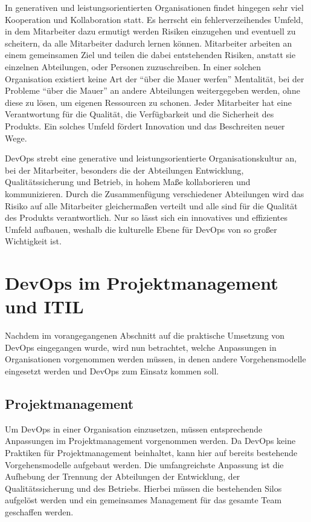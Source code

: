 In generativen und leistungsorientierten Organisationen findet hingegen sehr viel Kooperation und Kollaboration statt. 
Es herrscht ein fehlerverzeihendes Umfeld, in dem Mitarbeiter dazu ermutigt werden Risiken einzugehen und eventuell zu scheitern, da alle Mitarbeiter dadurch lernen können. 
Mitarbeiter arbeiten an einem gemeinsamen Ziel und teilen die dabei entstehenden Risiken, anstatt sie einzelnen Abteilungen, oder Personen zuzuschreiben. In einer solchen Organisation existiert keine Art der \enquote{über die Mauer werfen} Mentalität, bei der Probleme \enquote{über die Mauer} an andere Abteilungen weitergegeben werden, ohne diese zu lösen, um eigenen Ressourcen zu schonen. 
Jeder Mitarbeiter hat eine Verantwortung für die Qualität, die Verfügbarkeit und die Sicherheit des Produkts. 
Ein solches Umfeld fördert Innovation und das Beschreiten neuer Wege. \parencite[Vgl.][S. 2]{westrum:2004}

DevOps strebt eine generative und leistungsorientierte Organisationskultur an, bei der Mitarbeiter, besonders die der Abteilungen Entwicklung, Qualitätssicherung und Betrieb, in hohem Maße kollaborieren und kommunizieren. 
Durch die Zusammenfügung verschiedener Abteilungen wird das Risiko auf alle Mitarbeiter gleichermaßen verteilt und alle sind für die Qualität des Produkts verantwortlich.
Nur so lässt sich ein innovatives und effizientes Umfeld aufbauen, weshalb die kulturelle Ebene für DevOps von so großer Wichtigkeit ist.

\section{DevOps im Projektmanagement und ITIL} %
Nachdem im vorangegangenen Abschnitt auf die praktische Umsetzung von DevOps eingegangen wurde, wird nun betrachtet, welche Anpassungen in Organisationen vorgenommen werden müssen, in denen andere Vorgehensmodelle eingesetzt werden und DevOps zum Einsatz kommen soll.

\subsection{Projektmanagement}
Um DevOps in einer Organisation einzusetzen, müssen entsprechende Anpassungen im Projektmanagement vorgenommen werden. 
Da DevOps keine Praktiken für Projektmanagement beinhaltet, kann hier auf bereits bestehende Vorgehensmodelle aufgebaut werden.
Die umfangreichste Anpassung ist die Aufhebung der Trennung der Abteilungen der Entwicklung, der Qualitätssicherung und des Betriebs. 
Hierbei müssen die bestehenden Silos aufgelöst werden und ein gemeinsames Management für das gesamte Team geschaffen werden.
 
